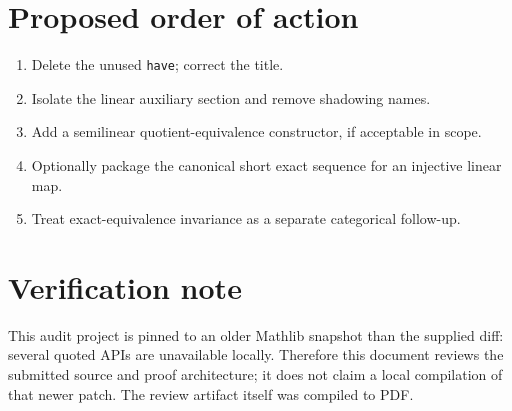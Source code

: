 \documentclass[10pt]{article}
\begin{document}
\section*{Proposed order of action}
\begin{enumerate}
\item Delete the unused \texttt{have}; correct the title.
\item Isolate the linear auxiliary section and remove shadowing names.
\item Add a semilinear quotient-equivalence constructor, if acceptable in scope.
\item Optionally package the canonical short exact sequence for an injective linear map.
\item Treat exact-equivalence invariance as a separate categorical follow-up.
\end{enumerate}

\section*{Verification note}
This audit project is pinned to an older Mathlib snapshot than the supplied diff: several quoted APIs
are unavailable locally. Therefore this document reviews the submitted source and proof architecture;
it does not claim a local compilation of that newer patch. The review artifact itself was compiled to
PDF.
\end{document}

